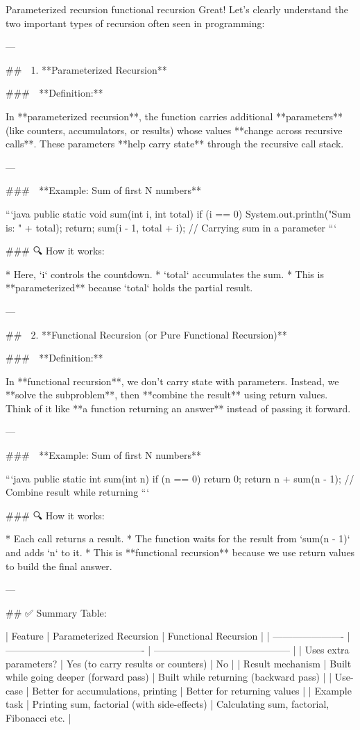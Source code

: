 Parameterized recursion
functional recursion 
Great! Let's clearly understand the two important types of recursion often seen in programming:

---

## 🔁 1. **Parameterized Recursion**

### 📌 **Definition:**

In **parameterized recursion**, the function carries additional **parameters** (like counters, accumulators, or results) whose values **change across recursive calls**. These parameters **help carry state** through the recursive call stack.

---

### 📘 **Example: Sum of first N numbers**

```java
public static void sum(int i, int total) {
    if (i == 0) {
        System.out.println("Sum is: " + total);
        return;
    }
    sum(i - 1, total + i);  // Carrying sum in a parameter
}
```

### 🔍 How it works:

* Here, `i` controls the countdown.
* `total` accumulates the sum.
* This is **parameterized** because `total` holds the partial result.

---

## 🔁 2. **Functional Recursion (or Pure Functional Recursion)**

### 📌 **Definition:**

In **functional recursion**, we don’t carry state with parameters. Instead, we **solve the subproblem**, then **combine the result** using return values. Think of it like **a function returning an answer** instead of passing it forward.

---

### 📘 **Example: Sum of first N numbers**

```java
public static int sum(int n) {
    if (n == 0) return 0;
    return n + sum(n - 1);  // Combine result while returning
}
```

### 🔍 How it works:

* Each call returns a result.
* The function waits for the result from `sum(n - 1)` and adds `n` to it.
* This is **functional recursion** because we use return values to build the final answer.

---

## ✅ Summary Table:

| Feature                | Parameterized Recursion                     | Functional Recursion                       |
| ---------------------- | ------------------------------------------- | ------------------------------------------ |
| Uses extra parameters? | Yes (to carry results or counters)          | No                                         |
| Result mechanism       | Built while going deeper (forward pass)     | Built while returning (backward pass)      |
| Use-case               | Better for accumulations, printing          | Better for returning values                |
| Example task           | Printing sum, factorial (with side-effects) | Calculating sum, factorial, Fibonacci etc. |

